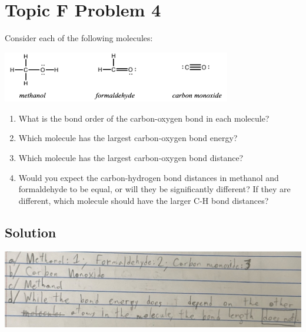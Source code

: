 \documentclass[10pt]{article}
\begin{document}
    \section{Topic F Problem 4}
        Consider each of the following molecules:
        \begin{center}
            \includegraphics[width=0.75\textwidth]{img-F4.png}
        \end{center}
        \begin{enumerate}[label=\alph*)]
            \item   What is the bond order of the carbon-oxygen bond in each molecule?
            \item   Which molecule has the largest carbon-oxygen bond energy?
            \item   Which molecule has the largest carbon-oxygen bond distance?
            \item   Would you expect the carbon-hydrogen bond distances in methanol and formaldehyde to be equal, or will they be significantly different? 
                If they are different, which molecule should have the larger C-H bond distances?
        \end{enumerate}
        
        \subsection{Solution}
            \begin{center}
                \includegraphics[width=\textwidth]{Answers Images/F4.jpg}
            \end{center}


    \pagebreak
\end{document}
